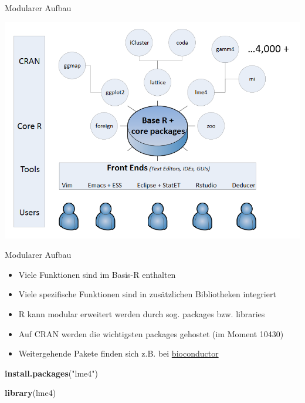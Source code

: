 \documentclass[
  ignorenonframetext,
]{beamer}
\newenvironment{Shaded}{\begin{snugshade}}{\end{snugshade}}
\newcommand{\KeywordTok}[1]{\textcolor[rgb]{0.26,0.66,0.93}{\textbf{#1}}}
\newcommand{\NormalTok}[1]{\textcolor[rgb]{0.74,0.68,0.62}{#1}}
\newcommand{\StringTok}[1]{\textcolor[rgb]{0.02,0.61,0.04}{#1}}
\providecommand{\tightlist}{%
  \setlength{\itemsep}{0pt}\setlength{\parskip}{0pt}}
\begin{document}
\begin{frame}{Modularer Aufbau}
\protect\hypertarget{modularer-aufbau}{}

\includegraphics{figure/Packages.PNG}

\end{frame}

\begin{frame}[fragile]{Modularer Aufbau}
\protect\hypertarget{modularer-aufbau-1}{}

\begin{itemize}
\tightlist
\item
  Viele Funktionen sind im Basis-R enthalten
\item
  Viele spezifische Funktionen sind in zusätzlichen Bibliotheken
  integriert
\item
  R kann modular erweitert werden durch sog. packages bzw. libraries
\item
  Auf CRAN werden die wichtigsten packages gehostet (im Moment 10430)
\item
  Weitergehende Pakete finden sich z.B. bei
  \href{www.bioconductor.org}{bioconductor}
\end{itemize}

\begin{Shaded}
\begin{Highlighting}[]
\KeywordTok{install.packages}\NormalTok{(}\StringTok{"lme4"}\NormalTok{)}

\KeywordTok{library}\NormalTok{(lme4)}
\end{Highlighting}
\end{Shaded}

\end{frame}
\end{document}
